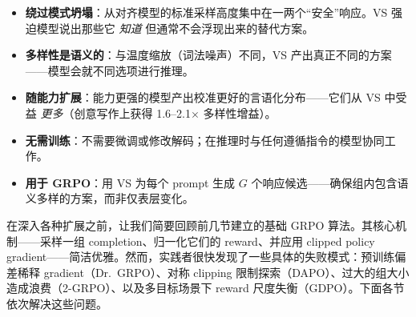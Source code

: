 \begin{intuitionbox}
\begin{itemize}
  \item \textbf{绕过模式坍塌}：从对齐模型的标准采样高度集中在一两个“安全”响应。VS 强迫模型说出那些它 \emph{知道} 但通常不会浮现出来的替代方案。
  \item \textbf{多样性是语义的}：与温度缩放（词法噪声）不同，VS 产出真正不同的方案——模型会就不同选项进行推理。
  \item \textbf{随能力扩展}：能力更强的模型产出校准更好的言语化分布——它们从 VS 中受益 \emph{更多}（创意写作上获得 1.6--2.1$\times$ 多样性增益）。
  \item \textbf{无需训练}：不需要微调或修改解码；在推理时与任何遵循指令的模型协同工作。
  \item \textbf{用于 GRPO}：用 VS 为每个 prompt 生成 $G$ 个响应候选——确保组内包含语义多样的方案，而非仅表层变化。
\end{itemize}
\end{intuitionbox}

在深入各种扩展之前，让我们简要回顾前几节建立的基础 GRPO 算法。其核心机制——采样一组 completion、归一化它们的 reward、并应用 clipped policy gradient——简洁优雅。然而，实践者很快发现了一些具体的失败模式：预训练偏差稀释 gradient（Dr.~GRPO）、对称 clipping 限制探索（DAPO）、过大的组大小造成浪费（2-GRPO）、以及多目标场景下 reward 尺度失衡（GDPO）。下面各节依次解决这些问题。

